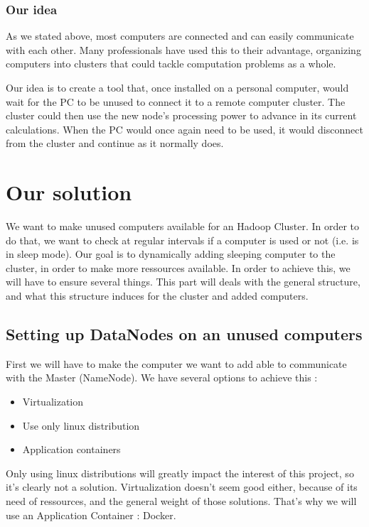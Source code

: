 \documentclass[11pt]{report} %
\begin{document}
\section{Our idea}
As we stated above, most computers are connected and can easily communicate with each other. Many professionals have used this to their advantage, organizing computers into clusters that could tackle computation problems as a whole.

Our idea is to create a tool that, once installed on a personal computer, would wait for the PC to be unused to connect it to a remote computer cluster. The cluster could then use the new node's processing power to advance in its current calculations. When the PC would once again need to be used, it would disconnect from the cluster and continue as it normally does.

\part{Our solution}
We want to make unused computers available for an Hadoop Cluster. In order to do that, we want to check at regular intervals if a computer is used or not (i.e. is in sleep mode). Our goal is to dynamically adding sleeping computer to the cluster, in order to make more ressources available.
In order to achieve this, we will have to ensure several things. This part will deals with the general structure, and what this structure induces for the cluster and added computers.
\chapter{Setting up DataNodes on an unused computers}
First we will have to make the computer we want to add able to communicate with the Master (NameNode). We have several options to achieve this : \begin{itemize}
\item Virtualization
\item Use only linux distribution
\item Application containers
\end{itemize}
Only using linux distributions will greatly impact the interest of this project, so it's clearly not a solution. Virtualization doesn't seem good either, because of its need of ressources, and the general weight of those solutions. That's why we will use an Application Container : Docker.
\end{document}
